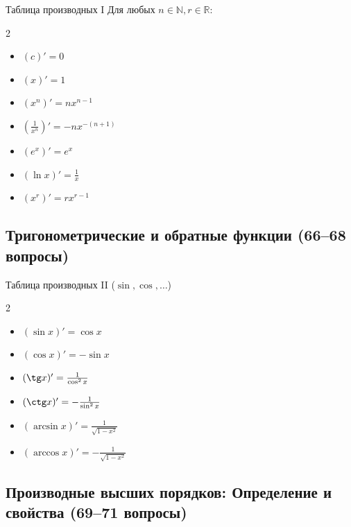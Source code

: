 \documentclass[a4paper,12pt]{article}
\begin{document}
	\begin{theorembox}{Таблица производных I}
		Для любых $n \in \mathbb{N}, r \in \mathbb{R}$:
		\begin{multicols}{2}
			\begin{itemize}
				\item $(c)' = 0$
				\item $(x)' = 1$
				\item $(x^n)' = n x^{n-1}$
				\item $(\frac{1}{x^n})' = -n x^{-(n+1)}$
				\item $(e^x)' = e^x$
				\item $(\ln x)' = \frac{1}{x}$
				\item $(x^r)' = r x^{r-1}$
			\end{itemize}
		\end{multicols}
	\end{theorembox}
	
	
	
	
	
	\subsection{Тригонометрические и обратные функции (66--68 вопросы)}
	
	\begin{theorembox}{{Таблица производных II ($\sin, \cos, \dots$)}}
		\begin{multicols}{2}
			\begin{itemize}
				\item $(\sin x)' = \cos x$
				\item $(\cos x)' = -\sin x$
				\item $(\tg x)' = \frac{1}{\cos^2 x}$
				\item $(\ctg x)' = -\frac{1}{\sin^2 x}$
				\item $(\arcsin x)' = \frac{1}{\sqrt{1-x^2}}$
				\item $(\arccos x)' = -\frac{1}{\sqrt{1-x^2}}$
			\end{itemize}
		\end{multicols}
	\end{theorembox}
	
	
	
	
	
	
	\subsection{Производные высших порядков: Определение и свойства (69--71 вопросы)}
	
\end{document}
